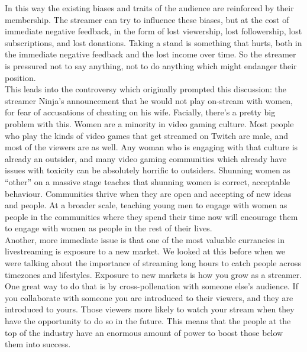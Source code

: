 \documentclass{article}
\begin{document}
In this way the existing biases and traits of the audience are reinforced by their membership. The streamer can try to influence these biases, but at the cost of immediate negative feedback, in the form of lost viewership, lost followership, lost subscriptions, and lost donations. Taking a stand is something that hurts, both in the immediate negative feedback and the lost income over time. So the streamer is pressured not to say anything, not to do anything which might endanger their position.\\

This leads into the controversy which originally prompted this discussion: the streamer Ninja's announcement that he would not play on-stream with women, for fear of accusations of cheating on his wife. Facially, there's a pretty big problem with this. Women are a minority in video gaming culture. Most people who play the kinds of video games that get streamed on Twitch are male, and most of the viewers are as well. Any woman who is engaging with that culture is already an outsider, and many video gaming communities which already have issues with toxicity can be absolutely horrific to outsiders. Shunning women as ``other'' on a massive stage teaches that shunning women is correct, acceptable behaviour. Communities thrive when they are open and accepting of new ideas and people. At a broader scale, teaching young men to engage with women as people in the communities where they spend their time now will encourage them to engage with women as people in the rest of their lives.\\

Another, more immediate issue is that one of the most valuable currancies in livestreaming is exposure to a new market. We looked at this before when we were talking about the importance of streaming long hours to catch people across timezones and lifestyles. Exposure to new markets is how you grow as a streamer. One great way to do that is by cross-pollenation with someone else's audience. If you collaborate with someone you are introduced to their viewers, and they are introduced to yours. Those viewers more likely to watch your stream when they have the opportunity to do so in the future. This means that the people at the top of the industry have an enormous amount of power to boost those below them into success.\\
\end{document}
